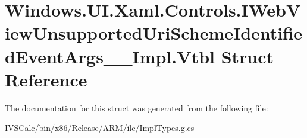 \hypertarget{struct_windows_1_1_u_i_1_1_xaml_1_1_controls_1_1_i_web_view_unsupported_uri_scheme_identified_event_args_____impl_1_1_vtbl}{}\section{Windows.\+U\+I.\+Xaml.\+Controls.\+I\+Web\+View\+Unsupported\+Uri\+Scheme\+Identified\+Event\+Args\+\_\+\+\_\+\+Impl.\+Vtbl Struct Reference}
\label{struct_windows_1_1_u_i_1_1_xaml_1_1_controls_1_1_i_web_view_unsupported_uri_scheme_identified_event_args_____impl_1_1_vtbl}


The documentation for this struct was generated from the following file\+:\begin{DoxyCompactItemize}
\item 
I\+V\+S\+Calc/bin/x86/\+Release/\+A\+R\+M/ilc/Impl\+Types.\+g.\+cs\end{DoxyCompactItemize}
